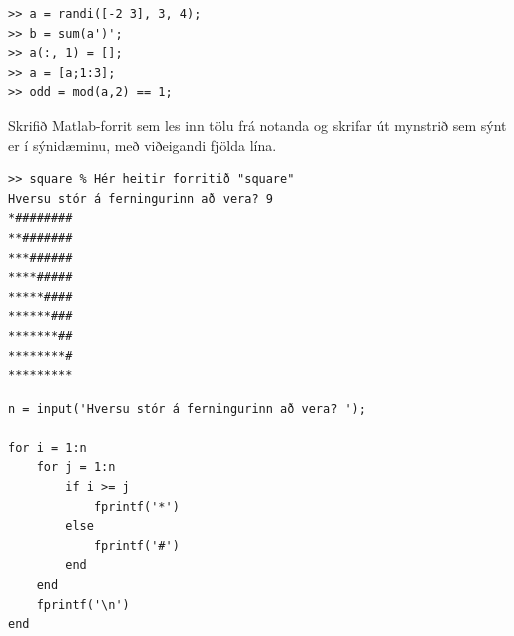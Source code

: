 \documentclass[addpoints]{exam}
\begin{document}
\begin{questions}

\begin{solution}

\begin{verbatim}
>> a = randi([-2 3], 3, 4);
>> b = sum(a')';
>> a(:, 1) = [];
>> a = [a;1:3];
>> odd = mod(a,2) == 1;
\end{verbatim}
\end{solution}

\newpage

\question[10] Skrifið Matlab-forrit sem les inn tölu frá notanda og skrifar út mynstrið sem sýnt er í sýnidæminu, með viðeigandi fjölda lína.

\begin{verbatim}
>> square % Hér heitir forritið "square"
Hversu stór á ferningurinn að vera? 9
*########
**#######
***######
****#####
*****####
******###
*******##
********#
*********
\end{verbatim}

\begin{solution}

\begin{verbatim}
n = input('Hversu stór á ferningurinn að vera? ');

for i = 1:n
    for j = 1:n
        if i >= j
            fprintf('*')
        else
            fprintf('#')
        end
    end
    fprintf('\n')
end
\end{verbatim}

\end{solution}


\end{questions}
\end{document}
